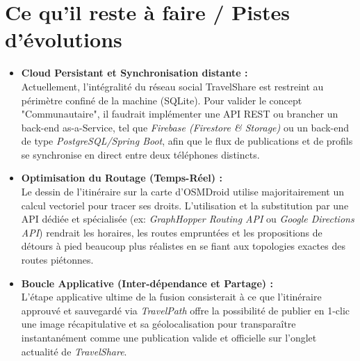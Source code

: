 \documentclass[11pt,a4paper]{article}
\begin{document}
\newpage

\section{Ce qu'il reste à faire / Pistes d'évolutions}

\begin{itemize}[label=\textcolor{primary}{\textbullet}]
    \item \textbf{Cloud Persistant et Synchronisation distante :}\\
    Actuellement, l'intégralité du réseau social TravelShare est restreint au périmètre confiné de la machine (SQLite). Pour valider le concept "Communautaire", il faudrait implémenter une API REST ou brancher un back-end as-a-Service, tel que \textit{Firebase (Firestore \& Storage)} ou  un back-end de type \textit{PostgreSQL/Spring Boot}, afin que le flux de publications et de profils se synchronise en direct entre deux téléphones distincts.

    \item \textbf{Optimisation du Routage (Temps-Réel) :}\\
    Le dessin de l'itinéraire sur la carte d'OSMDroid utilise majoritairement un calcul vectoriel pour tracer ses droits. L'utilisation et la substitution par une API dédiée et spécialisée (ex: \textit{GraphHopper Routing API} ou \textit{Google Directions API}) rendrait les horaires, les routes empruntées et les propositions de détours à pied beaucoup plus réalistes en se fiant aux topologies exactes des routes piétonnes.

    \item \textbf{Boucle Applicative (Inter-dépendance et Partage) :}\\
    L'étape applicative ultime de la fusion consisterait à ce que l'itinéraire approuvé et sauvegardé via \textit{TravelPath} offre la possibilité de publier en 1-clic une image récapitulative et sa géolocalisation pour transparaître instantanément comme une publication valide et officielle sur l'onglet actualité de \textit{TravelShare}. 
\end{itemize}
\end{document}
